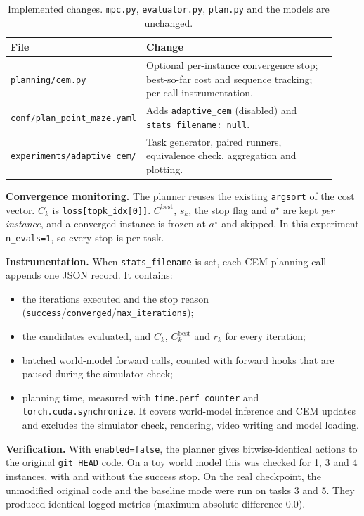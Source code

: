 \documentclass[10pt]{article}
\newcommand{\best}{\mathrm{best}}
\begin{document}
\begin{table}[H]
\centering\small
\begin{tabular}{p{0.30\linewidth}p{0.62\linewidth}}
\toprule
File & Change \\
\midrule
\texttt{planning/cem.py} & Optional per-instance convergence stop; best-so-far cost and sequence tracking; per-call instrumentation. \\
\texttt{conf/plan\_point\_maze.yaml} & Adds \texttt{adaptive\_cem} (disabled) and \texttt{stats\_filename: null}. \\
\texttt{experiments/adaptive\_cem/} & Task generator, paired runners, equivalence check, aggregation and plotting. \\
\bottomrule
\end{tabular}
\caption{Implemented changes. \texttt{mpc.py}, \texttt{evaluator.py}, \texttt{plan.py} and the models are unchanged.}
\label{tab:status}
\end{table}

\textbf{Convergence monitoring.} The planner reuses the existing \texttt{argsort} of the cost vector. $C_k$ is
\texttt{loss[topk\_idx[0]]}. $C^{\best}$, $s_k$, the stop flag and $a^\star$ are kept \emph{per instance}, and a converged
instance is frozen at $a^\star$ and skipped. In this experiment \texttt{n\_evals=1}, so every stop is per task.

\textbf{Instrumentation.} When \texttt{stats\_filename} is set, each CEM planning call appends one JSON record. It contains:
\begin{itemize}[leftmargin=1.2em]
\item the iterations executed and the stop reason (\texttt{success}/\texttt{converged}/\texttt{max\_iterations});
\item the candidates evaluated, and $C_k$, $C_k^{\best}$ and $r_k$ for every iteration;
\item batched world-model forward calls, counted with forward hooks that are paused during the simulator check;
\item planning time, measured with \texttt{time.perf\_counter} and \texttt{torch.cuda.synchronize}. It covers world-model inference and CEM
updates and excludes the simulator check, rendering, video writing and model loading.
\end{itemize}

\textbf{Verification.} With \texttt{enabled=false}, the planner gives bitwise-identical actions to the
original \texttt{git HEAD} code. On a toy world model this was checked for 1, 3 and 4 instances, with and without the success stop. On the real
checkpoint, the unmodified original code and the baseline mode were run on tasks 3 and 5. They produced identical logged metrics (maximum
absolute difference 0.0).
\end{document}
